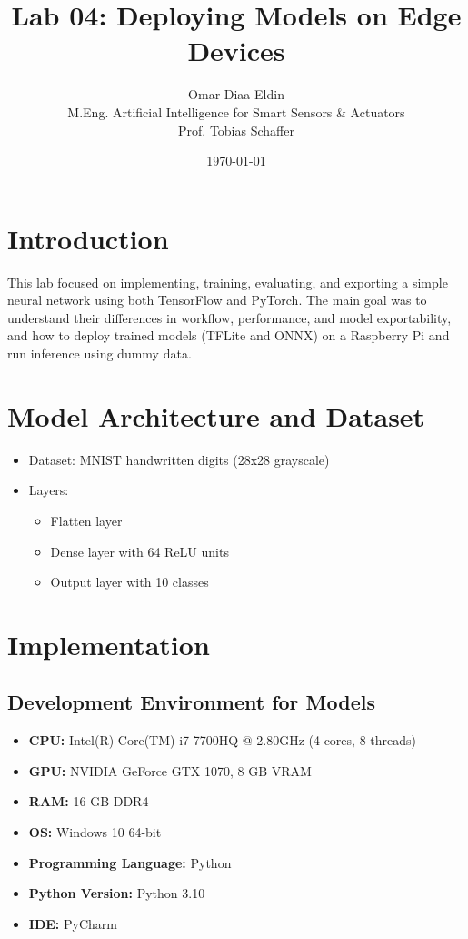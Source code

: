 \documentclass[a4paper,12pt]{article}
\title{Lab 04: Deploying Models on Edge Devices}
\author{Omar Diaa Eldin \\ M.Eng. Artificial Intelligence for Smart Sensors \& Actuators \\ Prof. Tobias Schaffer}
\date{\today}
\begin{document}
\maketitle

\section{Introduction}
This lab focused on implementing, training, evaluating, and exporting a simple neural network using both TensorFlow and PyTorch. The main goal was to understand their differences in workflow, performance, and model exportability, and how to deploy trained models (TFLite and ONNX) on a Raspberry Pi and run inference using dummy data.

\section{Model Architecture and Dataset}
\begin{itemize}
    \item Dataset: MNIST handwritten digits (28x28 grayscale)
    \item Layers:
    \begin{itemize}
        \item Flatten layer
        \item Dense layer with 64 ReLU units
        \item Output layer with 10 classes
    \end{itemize}
\end{itemize}

\section{Implementation}

\subsection{Development Environment for Models}
\begin{itemize}
    \item \textbf{CPU:} Intel(R) Core(TM) i7-7700HQ @ 2.80GHz (4 cores, 8 threads)
    \item \textbf{GPU:} NVIDIA GeForce GTX 1070, 8 GB VRAM
    \item \textbf{RAM:} 16 GB DDR4
    \item \textbf{OS:} Windows 10 64-bit
    \item \textbf{Programming Language:} Python
    \item \textbf{Python Version:} Python 3.10
    \item \textbf{IDE:} PyCharm
\end{itemize}
\end{document}
